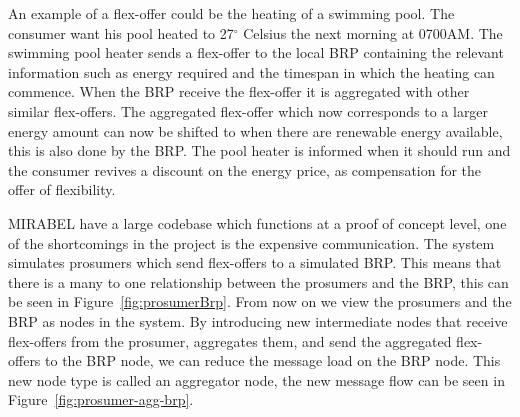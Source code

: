 \documentclass{ifacconf}
\begin{document}
An example of a flex-offer could be the heating of a swimming pool. 
The consumer want his pool heated to 27$^\circ$ Celsius the next morning at 0700AM.
The swimming pool heater sends a flex-offer to the local BRP containing the relevant information such as energy required and the timespan in which the heating can commence.
When the BRP receive the flex-offer it is aggregated with other similar flex-offers. 
The aggregated flex-offer which now corresponds to a larger energy amount can now be shifted to when there are renewable energy available, this is also done by the BRP.  
The pool heater is informed when it should run and the consumer revives a discount on the energy price, as compensation for the offer of flexibility. 


MIRABEL have a large codebase which functions at a proof of concept level, one of the shortcomings in the project is the expensive communication.
The system simulates prosumers which send flex-offers to a simulated BRP. 
This means that there is a many to one relationship between the prosumers and the BRP, this can be seen in Figure~\ref{fig:prosumerBrp}.
From now on we view the prosumers and the BRP as nodes in the system.
By introducing new intermediate nodes that receive flex-offers from the prosumer, aggregates them, and send the aggregated flex-offers to the BRP node, we can reduce the message load on the BRP node. 
This new node type is called an aggregator node, the new message flow can be seen in Figure~\ref{fig:prosumer-agg-brp}.
\end{document}
